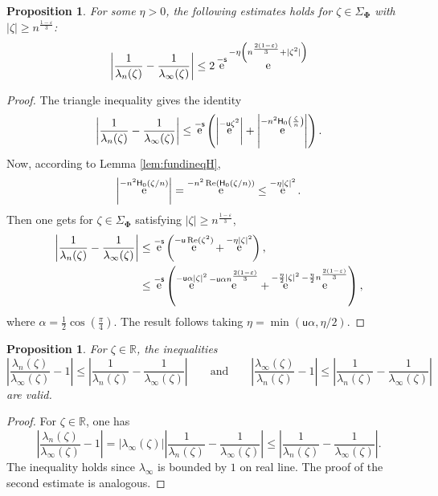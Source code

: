 \documentclass[reqno,a4paper,11pt]{amsart}
\DeclareMathOperator{\ee}{\rm e}
\renewcommand{\Re}{\mathop{\rm Re}}
\newcommand{\R}{\mathbb{R}}
\renewcommand{\bm}{\mathbf}
\newcommand{\msf}{\mathsf}
\newcommand{\sad}{\msf s}
\newcommand{\uad}{\msf u}
\newtheorem{prop}[theorem]{Proposition}
\theoremstyle{definition}
\theoremstyle{remark}
\numberwithin{equation}{section}
\begin{document}
\begin{prop}\label{lem:asymptotics2_lem2}
    For some $\eta > 0$, the following estimates holds for $\zeta\in\Sigma_{\bm \Phi}$ with $|\zeta|\geq n^{\frac{1-\varepsilon}{3}}$:
    \[
        \left|\frac{1}{\lambda_n(\zeta)}-\frac{1}{\lambda_\infty(\zeta)}\right|
            \leq 2 \ee^{-\sad} \ee^{-\eta \left(n^{\frac{2(1-\varepsilon)}{3}}+|\zeta^2|\right)}
    \]
\end{prop}
\begin{proof}
    The triangle inequality gives the identity
    \[
        \left|\frac{1}{\lambda_n(\zeta)}-\frac{1}{\lambda_\infty(\zeta)}\right|
            \leq \ee^{-\sad}\left(\left|\ee^{-\uad\zeta^2}\right|+\left|\ee^{-n^2\msf H_0\left(\frac{\zeta}{n}\right)}\right|\right).
    \]
    Now, according to Lemma \ref{lem:fundineqH},
    $$\left|\ee^{-n^2\msf H_0(\zeta/n)}\right|=\ee^{-n^2\Re(\msf H_0(\zeta/n))}\leq\ee^{-\eta|\zeta|^2}.$$
    Then one gets for $\zeta\in\Sigma_{\bm \Phi}$ satisfying $|\zeta|\geq n^{\frac{1 - \varepsilon}{3}}$, 
    \[
        \begin{split}
        \left|\frac{1}{\lambda_n(\zeta)}-\frac{1}{\lambda_\infty(\zeta)}\right|
            &\leq \ee^{-\sad}\left(\ee^{-\uad\Re(\zeta^2)}+\ee^{-\eta|\zeta|^2}\right),\\ 
            &\leq \ee^{-\sad}\left(\ee^{-\uad\alpha|\zeta|^2}\ee^{-\uad\alpha n^{\frac{2(1-\varepsilon)}{3}}}+\ee^{-\frac{\eta}{2}|\zeta|^2}\ee^{-\frac{\eta}{2}n^{\frac{2(1-\varepsilon)}{3}}}\right),
        \end{split}
    \]
    where $\alpha=\frac{1}{2}\cos(\frac{\pi}{4})$.
    The result follows taking  $\eta=\min(\uad\alpha,\eta/2)$.
\end{proof}



\begin{prop}\label{lem:asymptotics2_lem3}
    For $\zeta\in\R$, the inequalities
    $$\left|\frac{\lambda_n(\zeta)}{\lambda_\infty(\zeta)}-1\right|\leq \left|\frac{1}{\lambda_n(\zeta)}-\frac{1}{\lambda_\infty(\zeta)}\right|
    \qquad \text{and}\qquad
    \left|\frac{\lambda_\infty(\zeta)}{\lambda_n(\zeta)}-1\right|\leq \left|\frac{1}{\lambda_n(\zeta)}-\frac{1}{\lambda_\infty(\zeta)}\right|$$
    are valid.
\end{prop}
\begin{proof}
    For $\zeta\in\R$, one has $$\left|\frac{\lambda_n(\zeta)}{\lambda_\infty(\zeta)}-1\right|=\left|\lambda_\infty(\zeta)\right|\left|\frac{1}{\lambda_n(\zeta)}-\frac{1}{\lambda_\infty(\zeta)}\right|\leq \left|\frac{1}{\lambda_n(\zeta)}-\frac{1}{\lambda_\infty(\zeta)}\right|.$$
    The inequality holds since $\lambda_\infty$ is bounded by $1$ on real line. The proof of the second estimate is analogous.
    
\end{proof}
\end{document}
